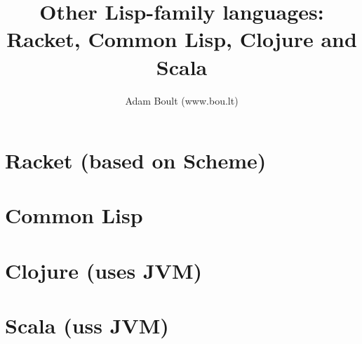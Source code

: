 \documentclass[oneside]{book}
\begin{document}
\author{Adam Boult (www.bou.lt)}
\title{Other Lisp-family languages: Racket, Common Lisp, Clojure and Scala}
\maketitle

\setcounter{tocdepth}{0}
\tableofcontents



\part{Racket (based on Scheme)}

\part{Common Lisp}

\part{Clojure (uses JVM)}

\part{Scala (uss JVM)}
\end{document}
